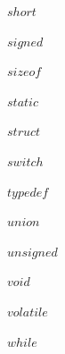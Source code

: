  			\begin{minipage}[c]{2.2 cm}
	 			\begin{compactitem}		 
	 			 	\item $short$ 			 	
	 			 	\item $signed$ 			 	
	 			 	\item $sizeof$ 			 	
	 			 	\item $static$	
	 			\end{compactitem}
	 		\end{minipage}
 			\begin{minipage}[c]{2.2 cm}
	 			\begin{compactitem}		 	
	 			 	\item $struct$ 		 	
	 			 	\item $switch$ 			 	
	 			 	\item $typedef$ 			 	
	 			 	\item $union$ 			 	
	 			\end{compactitem}
	 		\end{minipage}
 			\begin{minipage}[c]{2.3 cm}
	 			\begin{compactitem}		 	
	 			 	\item $unsigned$ 			 	
	 			 	\item $void$	
	 			 	\item $volatile$		 	
	 			 	\item $while$
	 			\end{compactitem}
	 		\end{minipage}
	 		
